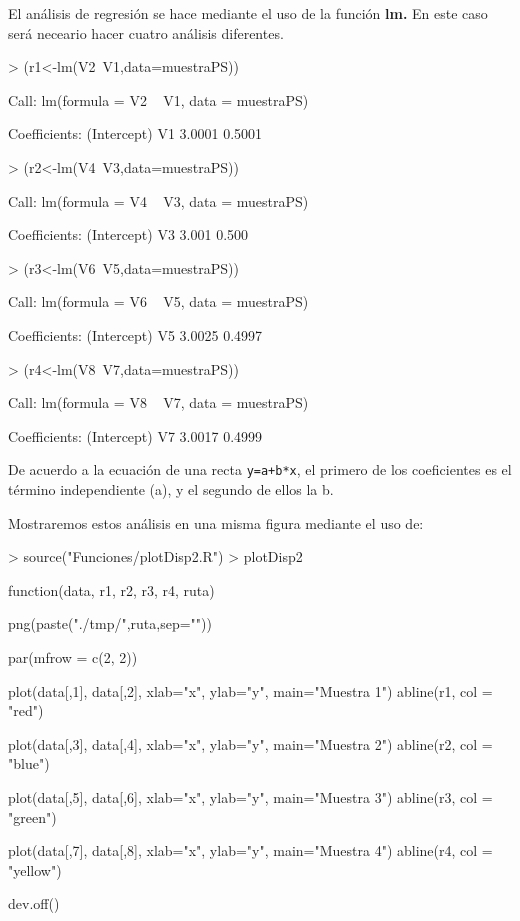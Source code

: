 \documentclass [a4paper] {article}
\begin{document}
\bigskip
El análisis de regresión se hace mediante el uso de la función \textbf{lm.} En este caso será neceario hacer cuatro análisis diferentes.
\begin{Schunk}
\begin{Sinput}
> (r1<-lm(V2~V1,data=muestraPS))
\end{Sinput}
\begin{Soutput}
Call:
lm(formula = V2 ~ V1, data = muestraPS)

Coefficients:
(Intercept)           V1  
     3.0001       0.5001  
\end{Soutput}
\begin{Sinput}
> (r2<-lm(V4~V3,data=muestraPS))
\end{Sinput}
\begin{Soutput}
Call:
lm(formula = V4 ~ V3, data = muestraPS)

Coefficients:
(Intercept)           V3  
      3.001        0.500  
\end{Soutput}
\begin{Sinput}
> (r3<-lm(V6~V5,data=muestraPS))
\end{Sinput}
\begin{Soutput}
Call:
lm(formula = V6 ~ V5, data = muestraPS)

Coefficients:
(Intercept)           V5  
     3.0025       0.4997  
\end{Soutput}
\begin{Sinput}
> (r4<-lm(V8~V7,data=muestraPS))
\end{Sinput}
\begin{Soutput}
Call:
lm(formula = V8 ~ V7, data = muestraPS)

Coefficients:
(Intercept)           V7  
     3.0017       0.4999  
\end{Soutput}
\end{Schunk}

\bigskip
De acuerdo a la ecuación de una recta \texttt{y=a+b*x}, el primero de los coeficientes es el término independiente (a), y el segundo
de ellos la b.

\bigskip
Mostraremos estos análisis en una misma figura mediante el uso de:
\begin{Schunk}
\begin{Sinput}
> source("Funciones/plotDisp2.R")
> plotDisp2
\end{Sinput}
\begin{Soutput}
function(data, r1, r2, r3, r4, ruta) {

    png(paste("./tmp/",ruta,sep=""))

    par(mfrow = c(2, 2))

    plot(data[,1], data[,2], xlab="x", ylab="y", main="Muestra 1")
    abline(r1, col = "red")

    plot(data[,3], data[,4], xlab="x", ylab="y", main="Muestra 2")
    abline(r2, col = "blue")

    plot(data[,5], data[,6], xlab="x", ylab="y", main="Muestra 3")
    abline(r3, col = "green")

    plot(data[,7], data[,8], xlab="x", ylab="y", main="Muestra 4")
    abline(r4, col = "yellow")

    dev.off()
}
\end{Soutput}
\end{Schunk}
\end{document}

